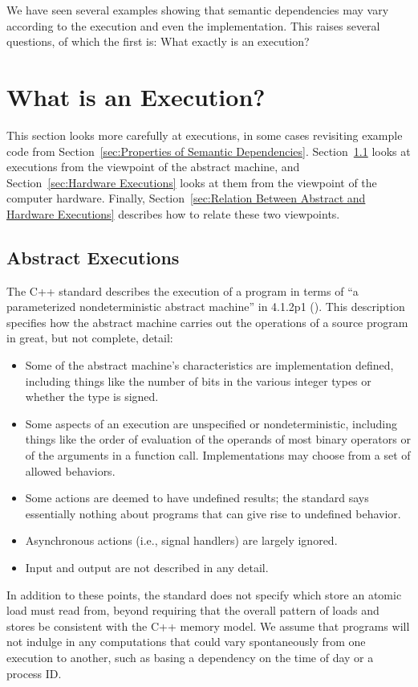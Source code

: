 \documentclass[10]{article}
\begin{document}
\medskip

We have seen several examples showing that semantic dependencies may vary
according to the execution and even the implementation.
This raises several questions, of which the first is:
What exactly is an execution?

\section{What is an Execution?}
\label{sec:What is an Execution?}

This section looks more carefully at executions, in some cases revisiting
example code from
Section~\ref{sec:Properties of Semantic Dependencies}.
Section~\ref{sec:Abstract Executions}
looks at executions from the viewpoint of the abstract machine, and
Section~\ref{sec:Hardware Executions}
looks at them from the viewpoint of the computer hardware.
Finally,
Section~\ref{sec:Relation Between Abstract and Hardware Executions}
describes how to relate these two viewpoints.

\subsection{Abstract Executions}
\label{sec:Abstract Executions}

The C++ standard describes the execution of a program in terms of
``a parameterized nondeterministic abstract machine'' in 4.1.2p1
().
This description specifies how the abstract machine carries out the
operations of a source program in great, but not complete, detail:
\begin{itemize}
\item	Some of the abstract machine's characteristics are
	implementation defined, including things like the number of
	bits in the various integer types
	or whether the  type is signed.
\item	Some aspects of an execution are unspecified or nondeterministic,
	including things like the order of evaluation of the operands
	of most binary operators or of the arguments in a function call.
	Implementations may choose from a set of allowed behaviors.
\item	Some actions are deemed to have undefined results; the standard
	says essentially nothing about programs that can give rise to
	undefined behavior.
\item	Asynchronous actions (i.e., signal handlers) are largely ignored.
\item	Input and output are not described in any detail.
\end{itemize}
In addition to these points, the standard does not specify which store
an atomic load must read from, beyond requiring that the overall
pattern of loads and stores be consistent with the C++ memory model.
We assume that programs will not indulge in any computations that
could vary spontaneously from one execution to another,
such as basing a dependency on the time of day or a process ID.
\end{document}

